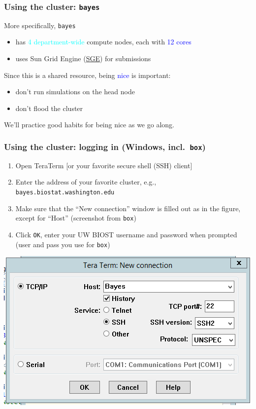 \documentclass[12pt, 
hyperref={colorlinks=true, linkcolor=BlueViolet, urlcolor=BlueViolet},dvipsnames]{beamer}
\begin{document}
\begin{frame}
\frametitle{Using the cluster: \texttt{bayes}}
More specifically, \texttt{bayes} \vspace{-0.3cm} \pause
\begin{itemize}
\item has \textcolor{cyan}{4 department-wide} compute nodes, each with \textcolor{blue}{12 cores} \pause
\item uses Sun Grid Engine (\href{https://en.wikipedia.org/wiki/Oracle_Grid_Engine}{SGE}) for submissions \pause
\end{itemize}

Since this is a shared resource, being \textcolor{blue}{nice} is important: \vspace{-0.3cm} \pause
\begin{itemize}
\item don't run simulations on the head node \pause
\item don't flood the cluster \pause
\end{itemize}

We'll practice good habits for being nice as we go along.
\end{frame}



\begin{frame}
\frametitle{Using the cluster: logging in (Windows, incl.~\texttt{box})}
\begin{enumerate}
\item Open TeraTerm [or your favorite secure shell (SSH) client]
\item Enter the address of your favorite cluster, e.g., \texttt{bayes.biostat.washington.edu}
\item Make sure that the ``New connection'' window is filled out as in the figure, except for ``Host'' (screenshot from \texttt{box})
\item Click \texttt{OK}, enter your UW BIOST username and password when prompted (user and pass you use for \texttt{box}) 
\end{enumerate}
\centering
\includegraphics[width = .45\textwidth]{plots/tera_term_example.png}
\end{frame}
\end{document}
